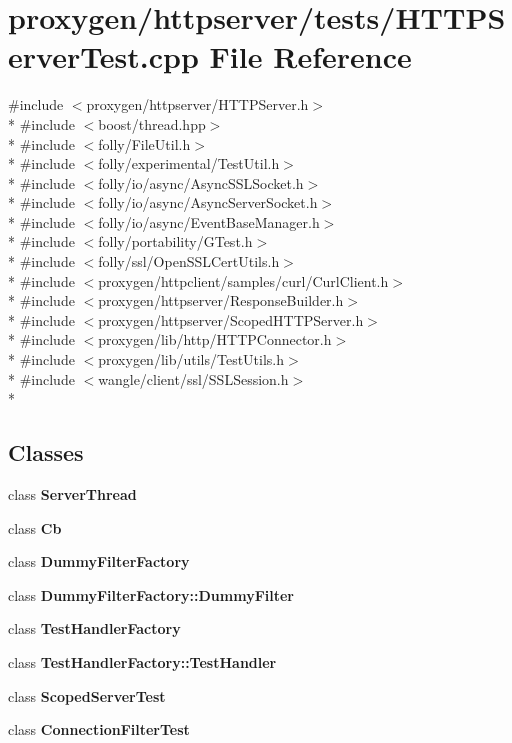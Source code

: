 \section{proxygen/httpserver/tests/\+H\+T\+T\+P\+Server\+Test.cpp File Reference}
\label{HTTPServerTest_8cpp}
{\ttfamily \#include $<$proxygen/httpserver/\+H\+T\+T\+P\+Server.\+h$>$}\\*
{\ttfamily \#include $<$boost/thread.\+hpp$>$}\\*
{\ttfamily \#include $<$folly/\+File\+Util.\+h$>$}\\*
{\ttfamily \#include $<$folly/experimental/\+Test\+Util.\+h$>$}\\*
{\ttfamily \#include $<$folly/io/async/\+Async\+S\+S\+L\+Socket.\+h$>$}\\*
{\ttfamily \#include $<$folly/io/async/\+Async\+Server\+Socket.\+h$>$}\\*
{\ttfamily \#include $<$folly/io/async/\+Event\+Base\+Manager.\+h$>$}\\*
{\ttfamily \#include $<$folly/portability/\+G\+Test.\+h$>$}\\*
{\ttfamily \#include $<$folly/ssl/\+Open\+S\+S\+L\+Cert\+Utils.\+h$>$}\\*
{\ttfamily \#include $<$proxygen/httpclient/samples/curl/\+Curl\+Client.\+h$>$}\\*
{\ttfamily \#include $<$proxygen/httpserver/\+Response\+Builder.\+h$>$}\\*
{\ttfamily \#include $<$proxygen/httpserver/\+Scoped\+H\+T\+T\+P\+Server.\+h$>$}\\*
{\ttfamily \#include $<$proxygen/lib/http/\+H\+T\+T\+P\+Connector.\+h$>$}\\*
{\ttfamily \#include $<$proxygen/lib/utils/\+Test\+Utils.\+h$>$}\\*
{\ttfamily \#include $<$wangle/client/ssl/\+S\+S\+L\+Session.\+h$>$}\\*
\subsection*{Classes}
\begin{DoxyCompactItemize}
\item 
class {\bf Server\+Thread}
\item 
class {\bf Cb}
\item 
class {\bf Dummy\+Filter\+Factory}
\item 
class {\bf Dummy\+Filter\+Factory\+::\+Dummy\+Filter}
\item 
class {\bf Test\+Handler\+Factory}
\item 
class {\bf Test\+Handler\+Factory\+::\+Test\+Handler}
\item 
class {\bf Scoped\+Server\+Test}
\item 
class {\bf Connection\+Filter\+Test}
\end{DoxyCompactItemize}
